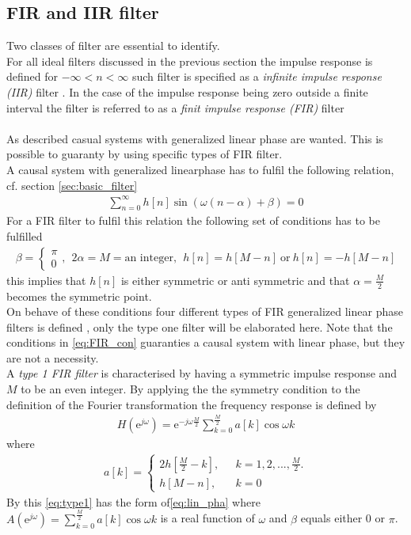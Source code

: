 \subsection{FIR and IIR filter} 
Two classes of filter are essential to identify.\\
For all ideal filters discussed in the previous section the impulse response is defined for $-\infty < n < \infty$ such filter is specified as a \textit{infinite impulse response (IIR)} filter . In the case of the impulse response being zero outside a finite interval the filter is referred to as a \textit{finit impulse response (FIR)} filter \\
\\
As described casual systems with generalized linear phase are wanted. This is possible to guaranty by using specific types of FIR filter.\\
A causal system with generalized linearphase has to fulfil the following relation, cf. section \ref{sec:basic_filter}
\begin{align}
\sum_{n=0}^{\infty}h[n]\sin\left(\omega \left(n-\alpha \right) + \beta \right) = 0
\end{align}
For a FIR filter to fulfil this relation the following set of conditions has to be fulfilled
\begin{align} \label{eq:FIR_con}
\beta = \left\{ \begin{matrix}
\pi  \\
0 
\end{matrix}\right. , \ \ 2\alpha = M = \text{an integer} , \ \ h[n]=h[M-n] \ \text{or} \ h[n]=-h[M-n]   
\end{align} 
this implies that $h[n]$ is either symmetric or anti symmetric and that $\alpha = \frac{M}{2}$ becomes the symmetric point. \\
On behave of these conditions four different types of FIR generalized linear phase filters is defined \cite{DTSP, p. 343}, only the type one filter will be elaborated here. Note that the conditions in \eqref{eq:FIR_con} guaranties a causal system with linear phase, but they are not a necessity. \\
A \textit{type 1 FIR filter} is characterised by having a symmetric impulse response and $M$ to be an even integer. By applying the the symmetry condition to the definition of the Fourier transformation the frequency response is defined by   
\begin{align}\label{eq:type1}
H(\text{e}^{j\omega})=\text{e}^{-j\omega \frac{M}{2}} \sum_{k=0}^{\frac{M}{2}} a[k]\cos \omega k
\end{align}
where 
\begin{align}
a[k]= \left\{ \begin{matrix}
2h\left[ \frac{M}{2} - k \right], \ \ &\ k=1,2,... , \frac{M}{2}.   \\
h[M-n], \ \ &\ k = 0  
\end{matrix}\right.
\end{align}
By this \eqref{eq:type1} has the form of\eqref{eq:lin_pha} where $A(\text{e}^{j\omega})= \sum_{k=0}^{\frac{M}{2}} a[k]\cos \omega k$ is a real function of $\omega$ and $\beta$ equals either 0 or $\pi$.\\
\\

